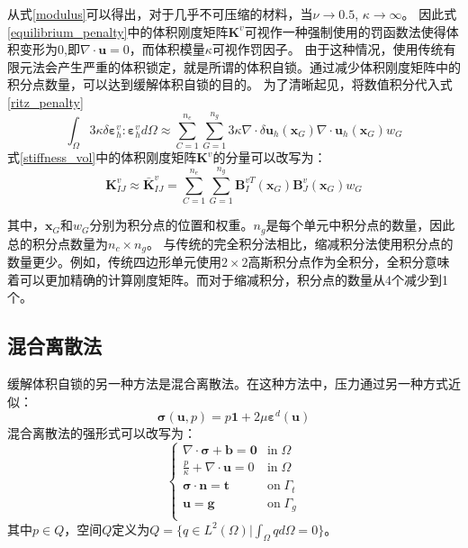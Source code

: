 从式\eqref{modulus}可以得出，对于几乎不可压缩的材料，当$\nu \rightarrow 0.5$, $\kappa \rightarrow \infty$。
因此式\eqref{equilibrium_penalty}中的体积刚度矩阵$\boldsymbol K^v$可视作一种强制使用的罚函数法使得体积变形为$0$,即$\nabla \cdot \boldsymbol u = 0$，而体积模量$\kappa$可视作罚因子。
由于这种情况，使用传统有限元法会产生严重的体积锁定，就是所谓的体积自锁。通过减少体积刚度矩阵中的积分点数量，可以达到缓解体积自锁的目的。
为了清晰起见，将数值积分代入式\eqref{ritz_penalty}
\begin{equation}
    \int_\Omega 3\kappa \delta \boldsymbol \varepsilon^v_h : \boldsymbol \varepsilon^v_h d\Omega \approx
    \sum_{C=1}^{n_e}\sum_{G=1}^{n_g} 3\kappa \nabla \cdot \delta \boldsymbol u_h(\boldsymbol x_G) \nabla \cdot \boldsymbol u_h(\boldsymbol x_G) w_G
\end{equation}
式\eqref{stiffness_vol}中的体积刚度矩阵$\boldsymbol K^v$的分量可以改写为：
\begin{equation}
    \boldsymbol K^v_{IJ} \approx \bar{\boldsymbol K}^v_{IJ} = \sum_{C=1}^{n_e}\sum_{G=1}^{n_g} \boldsymbol B^{vT}_I(\boldsymbol x_G) \boldsymbol B_J^v(\boldsymbol x_G) w_G
\end{equation}

其中，$\boldsymbol x_G$和$w_G$分别为积分点的位置和权重。$n_g$是每个单元中积分点的数量，因此总的积分点数量为$n_c \times n_g$。
与传统的完全积分法相比，缩减积分法使用积分点的数量更少。例如，传统四边形单元使用$2\times2$高斯积分点作为全积分，全积分意味着可以更加精确的计算刚度矩阵。而对于缩减积分，积分点的数量从4个减少到1个。

\subsection{混合离散法}
缓解体积自锁的另一种方法是混合离散法。在这种方法中，压力通过另一种方式近似：
\begin{equation}\label{stress_mix}
    \boldsymbol \sigma(\boldsymbol u, p) = p \boldsymbol 1 + 2\mu \boldsymbol \varepsilon^d(\boldsymbol u)
\end{equation}
混合离散法的强形式可以改写为：
\begin{equation}\label{strong_mix}
    \begin{cases}
        \nabla \cdot \boldsymbol \sigma + \boldsymbol b = \boldsymbol 0 & \mathrm{in} \; \Omega \\
        \frac{p}{\kappa} + \nabla \cdot \boldsymbol u = 0 & \mathrm{in} \; \Omega \\
        \boldsymbol \sigma \cdot \boldsymbol n = \boldsymbol t & \mathrm{on} \; \Gamma_t \\
        \boldsymbol u = \boldsymbol g & \mathrm{on} \; \Gamma_g \\
    \end{cases}
\end{equation}
其中$p\in Q$，空间$Q$定义为$Q = \{q \in L^2(\Omega) \vert \int_{\Omega} q d\Omega = 0\}$。

